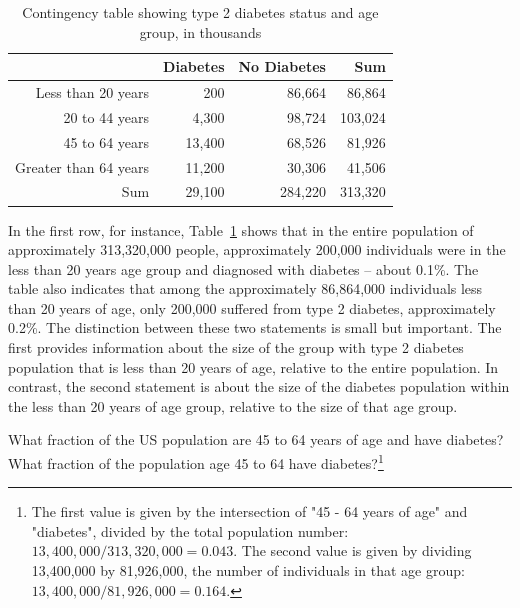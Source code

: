 \begin{table}[ht]
	\centering
	\begin{tabular}{rrrr}
		\hline
		& Diabetes & No Diabetes & Sum \\ 
		\hline
		Less than 20 years & 200 & 86,664 & 86,864 \\ 
		20 to 44 years & 4,300 & 98,724 & 103,024 \\ 
		45 to 64 years & 13,400 & 68,526 & 81,926 \\ 
		Greater than 64 years & 11,200 & 30,306 & 41,506 \\ 
		Sum & 29,100 & 284,220 & 313,320 \\ 
		\hline
	\end{tabular}
	\caption{Contingency table showing type 2 diabetes status and age group, in thousands}
	\label{DiabetesAgeContTable}
\end{table}

In the first row, for instance, Table~\ref{DiabetesAgeContTable} shows that in the entire population of approximately 313,320,000 people, approximately 200,000 individuals were in the less than 20 years age group and diagnosed with diabetes -- about 0.1\%. The table also indicates that among the approximately 86,864,000 individuals less than 20 years of age, only 200,000 suffered from type 2 diabetes, approximately 0.2\%.  The distinction between these two statements is small but important. The first provides information about the size of the group with type 2 diabetes population that is less than 20 years of age, relative to the entire population. In contrast, the second statement is about the size of the diabetes population within the less than 20 years of age group, relative to the size of that age group. 

\begin{exercise} \label{DiabetesAge20to44}

What fraction of the US population are 45 to 64 years of age and have diabetes?  What fraction of the population age 45 to 64 have diabetes?\footnote{The first value is given by the intersection of "45 - 64 years of age" and "diabetes", divided by the total population number: $13,400,000/313,320,000 = 0.043$. The second value is given by dividing 13,400,000 by 81,926,000, the number of individuals in that age group: $13,400,000/81,926,000 = 0.164$.}

\end{exercise}


